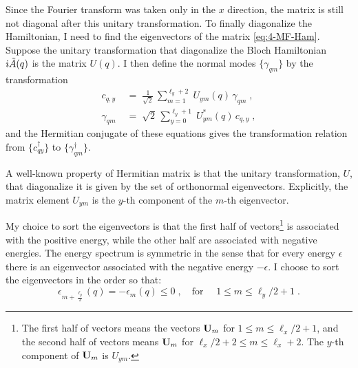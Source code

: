 Since the Fourier transform was taken only in the $x$ direction, the matrix is still not diagonal after this unitary transformation. To finally diagonalize the Hamiltonian, I need to find the eigenvectors of the matrix  \eqref{eq:4-MF-Ham}. Suppose the unitary transformation that diagonalize the Bloch Hamiltonian $\im \tilde{A}(q)$ is the matrix $U(q)$. I then define the normal modes $\{  \gamma_{qm} \}$ by the transformation %
\begin{align}
    c_{q,y} \; & = \; \frac{1}{\sqrt{2}}\, \sum_{m=1}^{\ell_y+2} \; U_{ym}(q) \, \gamma_{qm} \; , \;%
    \\
      \gamma_{qm} \; & = \; \sqrt{2} \, \sum_{y=0}^{\ell_y+1} \; U^\ast_{ym}(q) \,  c_{q,y} \; ,
\end{align}
and the Hermitian conjugate of these equations gives the transformation relation from $\{ c_{qy}^\dagger \}$ to $\{  \gamma_{qm}^{\dagger} \}$.

A well-known property of Hermitian matrix is that the unitary transformation, $U$, that diagonalize it is given by the set of orthonormal eigenvectors. Explicitly, the matrix element $U_{ym}$ is the $y$-th component of the $m$-th eigenvector. 

My choice to sort the eigenvectors is that the first half of vectors\footnote{The first half of vectors means the vectors $\bf{U}_m$ for $1\leq m \leq \ell_x/2+1$, and the second half of vectors means $\bf{U}_m$ for $\ell_x/2+2 \leq m \leq \ell_x +2$. The $y$-th component of $\bf{U}_m$ is $U_{ym}$.} is associated with the positive energy, while the other half are associated with negative energies. The energy spectrum is symmetric in the sense that for every energy $\epsilon$ there is an eigenvector associated with the negative energy $-\epsilon$. I choose to sort the eigenvectors in the order so that:
\begin{equation}
    \epsilon_{m+\frac{\ell_y}{2}}(q) = - \epsilon_{m}(q) \leq 0 \; , \quad \text{for } \quad 1\leq m \leq \ell_y/2+1 \; .
\end{equation}

